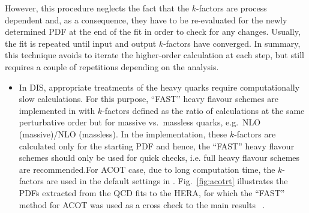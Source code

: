   However, this procedure neglects the fact that the $k$-factors are
  process dependent and, 
  as a consequence, they have to be re-evaluated
  for the newly determined PDF at the end of the fit in order to check
  for any changes. Usually, the fit is repeated until input and output
  $k$-factors have converged. In summary, this technique avoids to
  iterate the higher-order calculation at each step, but still
  requires a couple of repetitions depending on the analysis.


\begin{itemize}
%
  \item In DIS, appropriate treatments of the heavy quarks require  
    computationally slow calculations.
    For this purpose, ``FAST'' heavy flavour schemes are implemented
    in \fitter with $k$-factors defined as the ratio of
    calculations at the same perturbative order but for massive vs.\
    massless quarks, e.g.\ NLO (massive)/NLO (massless).
    In the \fitter
    implementation, these $k$-factors are calculated only for the
    starting PDF and hence, the ``FAST'' heavy flavour schemes should
    only be used for quick checks, i.e. full heavy flavour schemes
    are recommended.For ACOT case,
    due to long computation time, the $k$-factors are used in 
    the default settings in \fitter.  Fig.~\ref{fig:acotrt} illustrates
    the PDFs extracted from  the QCD fits to the HERA, for which 
     the ``FAST'' method for ACOT was used as a cross check to the main results ~\cite{h1zeus:2009wt}.


\end{itemize}

